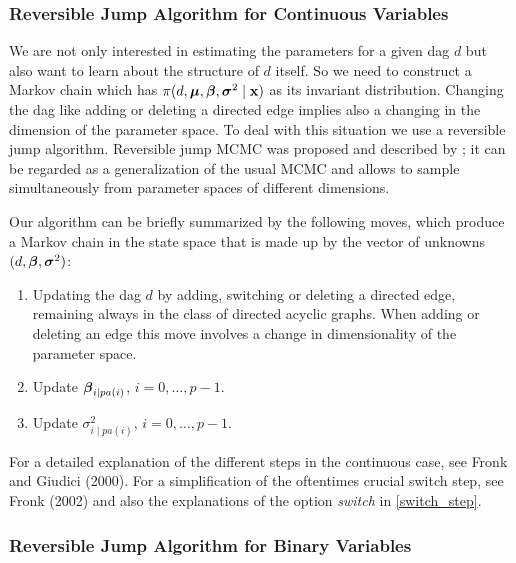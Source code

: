 \subsubsection*{Reversible Jump Algorithm for Continuous Variables}

We are not only interested in estimating the parameters for a
given dag $d$ but also want to learn about the structure of $d$
itself. So we need to construct a Markov chain which has $
\pi(d,\mbox{\boldmath $\mu$}, \mbox{\boldmath $\beta$}, \mbox{\boldmath $\sigma$}^2\mid \mathbf{x})$ as its invariant
distribution. Changing the dag like adding or deleting a directed
edge implies also a changing in the dimension of the parameter
space. To deal with this situation we use a reversible jump
algorithm. Reversible jump MCMC was proposed and described by
; it can be regarded as a generalization of the usual
MCMC and allows to sample simultaneously from parameter spaces of
different dimensions.

Our algorithm can be briefly summarized by the following moves,
which produce a Markov chain in the state space that is made up by
the vector of unknowns $(d,\mbox{\boldmath $\beta$},\mbox{\boldmath $\sigma$}^2)$:
%
\begin{enumerate}
\item Updating the dag $d$ by adding, switching or deleting a
directed edge, remaining always in the class of directed acyclic
graphs. When adding or deleting an edge this move involves a
change in dimensionality of the parameter space.
\item Update  $\mbox{\boldmath $\beta$}_{i\mid pa(i)}$, $i=0, \dots, p-1$.
\item Update $\sigma^2_{i\mid pa(i)}$, $i=0, \dots, p-1$.
\end{enumerate}
%
For a detailed explanation of the different steps in the
continuous case, see Fronk and Giudici (2000). For a
simplification of the oftentimes crucial switch step, see Fronk
(2002) and also the explanations of the option {\it switch} in
\autoref{switch_step}.

\newpage

\subsubsection*{Reversible Jump Algorithm for Binary Variables}

